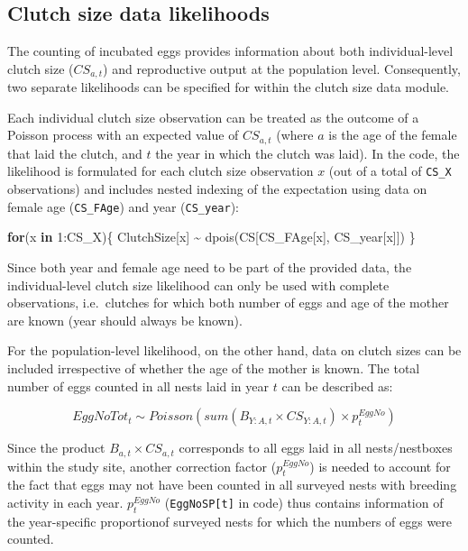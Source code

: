 \documentclass[
]{book}
\newenvironment{Shaded}{\begin{snugshade}}{\end{snugshade}}
\newcommand{\ControlFlowTok}[1]{\textcolor[rgb]{0.13,0.29,0.53}{\textbf{#1}}}
\newcommand{\DecValTok}[1]{\textcolor[rgb]{0.00,0.00,0.81}{#1}}
\newcommand{\FunctionTok}[1]{\textcolor[rgb]{0.00,0.00,0.00}{#1}}
\newcommand{\NormalTok}[1]{#1}
\newcommand{\SpecialCharTok}[1]{\textcolor[rgb]{0.00,0.00,0.00}{#1}}
\begin{document}
\hypertarget{clutch-size-data-likelihoods}{%
\subsection{Clutch size data likelihoods}\label{clutch-size-data-likelihoods}}

The counting of incubated eggs provides information about both individual-level
clutch size (\(CS_{a,t}\)) and reproductive output at the population level.
Consequently, two separate likelihoods can be specified for within the clutch
size data module.

Each individual clutch size observation can be treated as the outcome of a
Poisson process with an expected value of \(CS_{a,t}\) (where \(a\) is the age of
the female that laid the clutch, and \(t\) the year in which the clutch was laid).
In the code, the likelihood is formulated for each clutch size observation \(x\)
(out of a total of \texttt{CS\_X} observations) and includes nested indexing of the
expectation using data on female age (\texttt{CS\_FAge}) and year (\texttt{CS\_year}):

\begin{Shaded}
\begin{Highlighting}[]
\ControlFlowTok{for}\NormalTok{(x }\ControlFlowTok{in} \DecValTok{1}\SpecialCharTok{:}\NormalTok{CS\_X)\{}
\NormalTok{    ClutchSize[x] }\SpecialCharTok{\textasciitilde{}} \FunctionTok{dpois}\NormalTok{(CS[CS\_FAge[x], CS\_year[x]])}
\NormalTok{\}}
\end{Highlighting}
\end{Shaded}

Since both year and female age need to be part of the provided data, the
individual-level clutch size likelihood can only be used with complete
observations, i.e.~clutches for which both number of eggs and age of the mother
are known (year should always be known).

For the population-level likelihood, on the other hand, data on clutch sizes can
be included irrespective of whether the age of the mother is known. The total
number of eggs counted in all nests laid in year \(t\) can be described as:

\begin{equation}
EggNoTot_t \sim Poisson(sum(B_{Y:A,t} \times CS_{Y:A,t}) \times p_t^{EggNo})
\end{equation}

Since the product \(B_{a,t} \times CS_{a,t}\) corresponds to all eggs laid in all nests/nestboxes within the study site, another correction factor (\(p_t^{EggNo}\)) is needed to account for the fact that eggs may not have been counted in all surveyed nests with breeding activity in each year. \(p_t^{EggNo}\) (\texttt{EggNoSP{[}t{]}} in code) thus contains information of the year-specific proportionof surveyed nests for which the numbers of eggs were counted.
\end{document}
